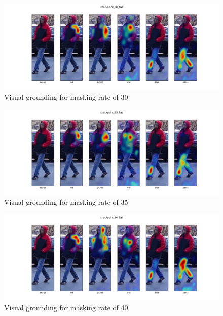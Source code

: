 \begin{figure}[htbp]
  \includegraphics[width=\linewidth]{img/mrtd_masking_ratio/mrtd-checkpoint_30_flat.png}
  \caption{Visual grounding for masking rate of 30}
  \label{fig:mtrd_4}
\end{figure}

\begin{figure}[htbp]
  \includegraphics[width=\linewidth]{img/mrtd_masking_ratio/mrtd-checkpoint_35_flat.png}
  \caption{Visual grounding for masking rate of 35}
  \label{fig:mtrd_5}
\end{figure}

\begin{figure}[htbp]
  \includegraphics[width=\linewidth]{img/mrtd_masking_ratio/mrtd-checkpoint_40_flat.png}
  \caption{Visual grounding for masking rate of 40}
  \label{fig:mtrd_6}
\end{figure}
